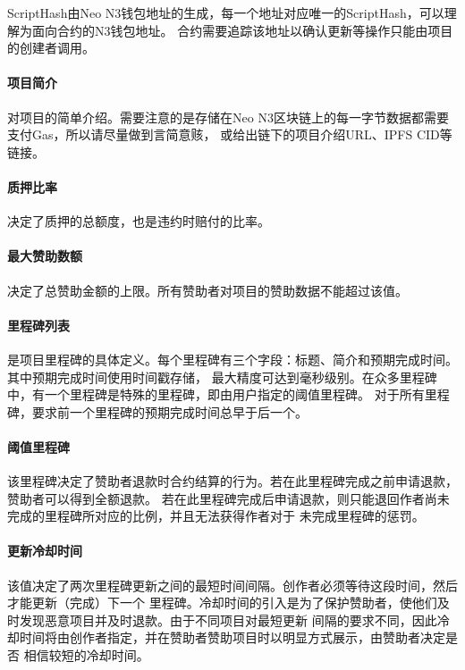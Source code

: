\documentclass[11pt,UTF8,a4paper]{ctexart}
\begin{document}
    ScriptHash由Neo N3钱包地址的生成，每一个地址对应唯一的ScriptHash，可以理解为面向合约的N3钱包地址。
    合约需要追踪该地址以确认更新等操作只能由项目的创建者调用。

    \paragraph{项目简介}

    对项目的简单介绍。需要注意的是存储在Neo N3区块链上的每一字节数据都需要支付Gas，所以请尽量做到言简意赅，
    或给出链下的项目介绍URL、IPFS CID等链接。

    \paragraph{质押比率}

    决定了质押的总额度，也是违约时赔付的比率。

    \paragraph{最大赞助数额}

    决定了总赞助金额的上限。所有赞助者对项目的赞助数据不能超过该值。

    \paragraph{里程碑列表}

    是项目里程碑的具体定义。每个里程碑有三个字段：标题、简介和预期完成时间。其中预期完成时间使用时间戳存储，
    最大精度可达到毫秒级别。在众多里程碑中，有一个里程碑是特殊的里程碑，即由用户指定的阈值里程碑。
    对于所有里程碑，要求前一个里程碑的预期完成时间总早于后一个。

    \paragraph{阈值里程碑}

    该里程碑决定了赞助者退款时合约结算的行为。若在此里程碑完成之前申请退款，赞助者可以得到全额退款。
    若在此里程碑完成后申请退款，则只能退回作者尚未完成的里程碑所对应的比例，并且无法获得作者对于
    未完成里程碑的惩罚。

    \paragraph{更新冷却时间}

    该值决定了两次里程碑更新之间的最短时间间隔。创作者必须等待这段时间，然后才能更新（完成）下一个
    里程碑。冷却时间的引入是为了保护赞助者，使他们及时发现恶意项目并及时退款。由于不同项目对最短更新
    间隔的要求不同，因此冷却时间将由创作者指定，并在赞助者赞助项目时以明显方式展示，由赞助者决定是否
    相信较短的冷却时间。
\end{document}
